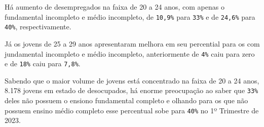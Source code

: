 \documentclass[preprint, 3p,
authoryear]{elsarticle} %
\begin{document}
Há aumento de desempregados na faixa de 20 a 24 anos, com apenas o
fundamental incompleto e médio incompleto, de \texttt{10,9\%} para
\texttt{33\%} e de \texttt{24,6\%} para \texttt{40\%}, respectivamente.

Já os jovens de 25 a 29 anos apresentaram melhora em seu percential para
os com jundamental incompleto e médio incompleto, anteriormente de
\texttt{4\%} caiu para zero e de \texttt{18\%} caiu para \texttt{7,8\%}.

Sabendo que o maior volume de jovens está concentrado na faixa de 20 a
24 anos, 8.178 jovens em estado de desocupados, há enorme preocupação ao
saber que \texttt{33\%} deles não possuem o ensiono fundamental completo
e olhando para os que não possuem ensino médio completo esse percentual
sobe para \texttt{40\%} no 1º Trimestre de 2023. \newpage
\begingroup\fontsize{9}{11}\selectfont
\end{document}
